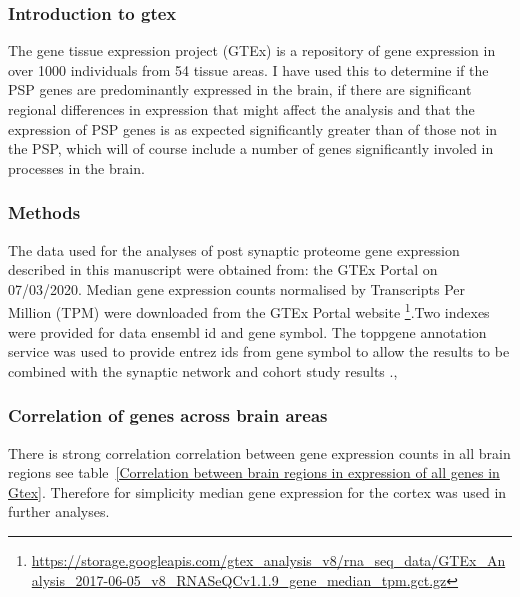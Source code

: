 \subsubsection{Introduction to gtex}
The gene tissue expression project (GTEx) is a repository of gene expression in over 1000 individuals from 54 tissue areas. I have used this to determine if the PSP genes are predominantly expressed in the brain, if there are significant regional differences in expression that might affect the analysis and that the expression of PSP genes is as expected significantly greater than of those not in the PSP, which will of course include a number of genes significantly involed in processes in the brain. 

\subsubsection{Methods}
The data used for the analyses of post synaptic proteome gene expression described in this manuscript were obtained from: the GTEx Portal on 07/03/2020. Median gene expression counts normalised by Transcripts Per Million (TPM)  were downloaded from the GTEx Portal website \footnote{ \url{https://storage.googleapis.com/gtex_analysis_v8/rna_seq_data/GTEx_Analysis_2017-06-05_v8_RNASeQCv1.1.9_gene_median_tpm.gct.gz}}.Two indexes were provided for data ensembl id and gene symbol. The toppgene annotation service was used to provide entrez ids from gene symbol to allow the results to be combined with the synaptic network and cohort study results .\cite{gtex2015genotype},\cite{conesa2016survey}
\subsubsection{Correlation of genes across brain areas}
There is strong correlation correlation between gene expression counts in all brain regions see table~\ref{Correlation between brain regions in expression of all genes in Gtex}. Therefore for simplicity median gene expression for the cortex was used in further analyses. 

